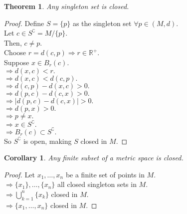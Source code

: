 \documentclass{article}
\newtheorem{theorem}{Theorem}[section]
\newtheorem{corollary}{Corollary}[theorem]
\begin{document}
			\begin{theorem}
				Any singleton set is closed.
			\end{theorem}
			\begin{proof}
				Define $S = \{p\}$ as the singleton set $\forall p \in (M, d)$. \\
				Let $c \in S^\complement = M / \{p\}$. \\
				Then, $c \neq p$. \\
				Choose $r = d(c, p) \Rightarrow r \in \mathbb{R}^+$. \\
				Suppose $x \in B_{r}(c)$. \\
				$\Rightarrow d(x, c) < r.$ \\
				$\Rightarrow d(x, c) < d(c, p).$ \\
				$\Rightarrow d(c, p) - d(x, c) > 0.$ \\
				$\Rightarrow d(p, c) - d(c, x) > 0.$ \\
				$\Rightarrow | d(p, c) - d(c, x) | > 0.$ \\
				$\Rightarrow d(p, x) > 0.$ \\
				$\Rightarrow p \neq x.$ \\
				$\Rightarrow x \in S^\complement.$ \\
				$\Rightarrow B_{r}(c) \subset S^\complement.$ \\
				So $S^\complement$ is open, making $S$ closed in $M$.
			\end{proof}

			\begin{corollary}
				Any finite subset of a metric space is closed.
			\end{corollary}
			\begin{proof}
				Let $x_1, \ldots, x_n$ be a finite set of points in $M$. \\
				$\Rightarrow \{x_1\}, \ldots, \{x_n\}$ all closed singleton sets in $M$. \\
				$\Rightarrow \bigcup_{k=1}^{n} \{x_k\}$ closed in $M$. \\
				$\Rightarrow \{ x_1, \ldots, x_n \}$ closed in $M$.
			\end{proof}
\end{document}
